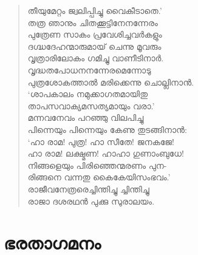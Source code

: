 \begin{verse}
തീയുമേറ്റം ജ്വലിപ്പിച്ചു വൈകീടാതെ.’\\
തത്ര ഞാനും ചിതക്കൂട്ടിനേനന്നേരം\\
പുത്രേണ സാകം പ്രവേശിച്ചവര്‍കളും\\
ദഗ്ദ്ധദേഹന്മാരുമായ് ചെന്നു മൂവരും\\
വൃത്രാരിലോകം ഗമിച്ചു വാണീടിനാര്‍.\\
വൃദ്ധതപോധനനന്നേരമെന്നോടു\\
പുത്രശോകത്താല്‍ മരിക്കെന്നു ചൊല്ലിനാന്‍.\\
‘ശാപകാലം നമുക്കാഗതമായിതു\\
താപസവാക്യമസത്യമായും വരാ.’\\
മന്നവനേവം പറഞ്ഞു വിലപിച്ചു\\
പിന്നെയും പിന്നെയും കേണു തുടങ്ങിനാന്‍:\\
‘ഹാ രാമ! പുത്ര! ഹാ സീതേ! ജനകജേ!\\
ഹാ രാമ! ലക്ഷ്മണ! ഹാഹാ ഗുണാംബുധേ!\\
നിങ്ങളെയും പിരിഞ്ഞെന്മരണം പുന-\\
രിങ്ങനെ വന്നതു കൈകേയിസംഭവം.’\\
രാജീവനേത്രരെച്ചിന്തിച്ചു ച്ചിന്തിച്ചു\\
രാജാ ദശരഥന്‍ പുക്കു സുരാലയം.
\end{verse}


\section{ഭരതാഗമനം}

